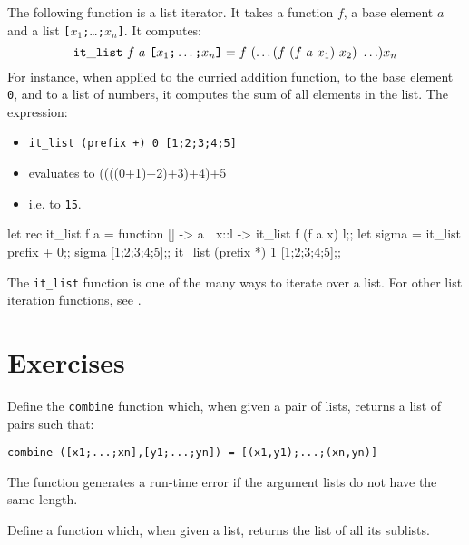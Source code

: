 The following function is a list iterator. It takes a function $f$, a
base element $a$ and a list
\verb|[|$x_1$\verb|;|\ldots\verb|;|$x_n$\verb|]|. It computes:
$$
{\tt it\_list} ~ f ~ a ~ \verb|[|x_1\verb|;|\ldots\verb|;|x_n\verb|]| =
f~ (\ldots (f ~(f~ a~ x_1)~ x_2)~\ldots) x_n
$$
For instance, when applied to the curried addition function, to the
base element \verb"0", and to a list of numbers, it computes the sum
of all elements in the list. The expression:
\begin{itemize}
\item[] \verb|it_list (prefix +) 0 [1;2;3;4;5]|
\item[] evaluates to ((((0+1)+2)+3)+4)+5
\item[] i.e. to \verb|15|.
\end{itemize}
\begin{caml_example}
let rec it_list f a =
        function [] -> a
               | x::l -> it_list f (f a x) l;;
let sigma = it_list prefix + 0;;
sigma [1;2;3;4;5];;
it_list (prefix *) 1 [1;2;3;4;5];;
\end{caml_example}
The \verb|it_list| function is one of the many ways to iterate
over a list. For other list iteration functions, see \cite{CAMLPrimer}.

\section*{Exercises}

%
\begin{exo}\label{Lists:1}
Define the {\tt combine} function which, when given a pair of lists, returns a 
list of pairs such that:
\begin{verbatim}
combine ([x1;...;xn],[y1;...;yn]) = [(x1,y1);...;(xn,yn)]
\end{verbatim}
The function generates a run-time error if  the argument lists do not
have the same length.
\end{exo}
\begin{exo}\label{Lists:2}
Define a function which, when given a list, returns the list of all its 
sublists.
\end{exo}
